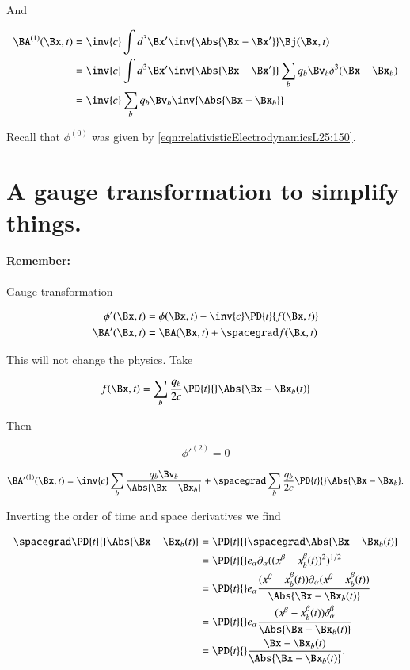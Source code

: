 And 

\begin{align*}
\BA^{(1)}(\Bx, t) 
&= \inv{c} \int d^3 \Bx' \inv{\Abs{\Bx - \Bx'}} \Bj(\Bx, t) \\
&= \inv{c} \int d^3 \Bx' \inv{\Abs{\Bx - \Bx'}} \sum_b q_b \Bv_b \delta^3(\Bx -\Bx_b) \\
&= \inv{c} \sum_b q_b \Bv_b \inv{\Abs{\Bx -\Bx_b}} \\
\end{align*}

Recall that $\phi^{(0)}$ was given by \ref{eqn:relativisticElectrodynamicsL25:150}.

\section{A gauge transformation to simplify things.}

\paragraph{Remember:} Gauge transformation

\begin{align}\label{eqn:relativisticElectrodynamicsL25:350}
\phi'(\Bx, t) &= \phi(\Bx, t) - \inv{c} \PD{t}{f(\Bx, t)} \\
\BA'(\Bx, t) &= \BA(\Bx, t) + \spacegrad f(\Bx, t) \\
\end{align}

This will not change the physics.  Take

\begin{equation}\label{eqn:relativisticElectrodynamicsL25:370}
f(\Bx, t) = \sum_b \frac{q_b}{2 c} \PD{t}{} \Abs{\Bx - \Bx_b(t)}
\end{equation}

Then 

\begin{equation}\label{eqn:relativisticElectrodynamicsL25:390}
{\phi'}^{(2)} = 0
\end{equation}

\begin{equation}\label{eqn:relativisticElectrodynamicsL25:410}
{\BA'}^{(1)}(\Bx, t) = \inv{c} \sum_b \frac{q_b \Bv_b}{\Abs{\Bx - \Bx_b}} + \spacegrad \sum_b \frac{q_b}{2 c} \PD{t}{} \Abs{\Bx - \Bx_b}.
\end{equation}

Inverting the order of time and space derivatives we find

\begin{align*}
\spacegrad \PD{t}{} \Abs{\Bx - \Bx_b(t)}
&=
\PD{t}{} \spacegrad \Abs{\Bx - \Bx_b(t)} \\
&=
\PD{t}{} e_\alpha \partial_\alpha ((x^\beta - x_b^\beta(t))^2)^{1/2}
 \\
&=
\PD{t}{} e_\alpha 
\frac{(x^\beta - x_b^\beta(t)) \partial_\alpha (x^\beta - x_b^\beta(t))}{\Abs{\Bx -\Bx_b(t)}}
 \\
&=
\PD{t}{} e_\alpha
\frac{(x^\beta - x_b^\beta(t)) \delta_\alpha^\beta}{\Abs{\Bx -\Bx_b(t)}}
 \\
&=
\PD{t}{} 
\frac{\Bx - \Bx_b(t)}{\Abs{\Bx -\Bx_b(t)}}.
\end{align*}

